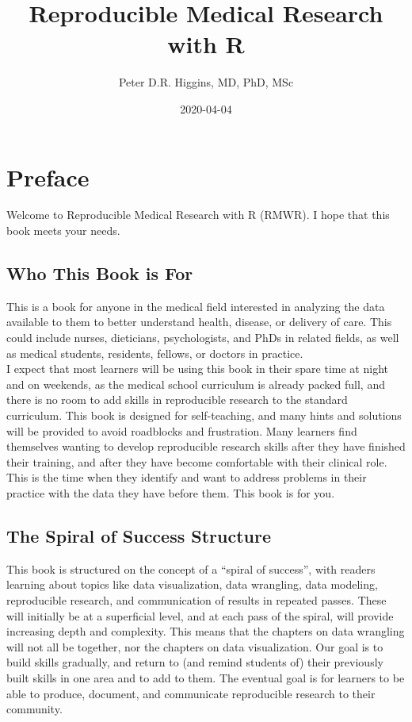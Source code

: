 \documentclass[]{book}
\title{Reproducible Medical Research with R}
\author{Peter D.R. Higgins, MD, PhD, MSc}
\date{2020-04-04}
\begin{document}
\maketitle

{
\setcounter{tocdepth}{1}
\tableofcontents
}
\hypertarget{preface}{%
\chapter{Preface}\label{preface}}

Welcome to Reproducible Medical Research with R (RMWR). I hope that this book meets your needs.

\hypertarget{who-this-book-is-for}{%
\section{Who This Book is For}\label{who-this-book-is-for}}

This is a book for anyone in the medical field interested in analyzing the data available to them to better understand health, disease, or delivery of care. This could include nurses, dieticians, psychologists, and PhDs in related fields, as well as medical students, residents, fellows, or doctors in practice.\\
I expect that most learners will be using this book in their spare time at night and on weekends, as the medical school curriculum is already packed full, and there is no room to add skills in reproducible research to the standard curriculum. This book is designed for self-teaching, and many hints and solutions will be provided to avoid roadblocks and frustration.
Many learners find themselves wanting to develop reproducible research skills after they have finished their training, and after they have become comfortable with their clinical role. This is the time when they identify and want to address problems in their practice with the data they have before them. This book is for you.

\hypertarget{the-spiral-of-success-structure}{%
\section{The Spiral of Success Structure}\label{the-spiral-of-success-structure}}

This book is structured on the concept of a ``spiral of success'', with readers learning about topics like data visualization, data wrangling, data modeling, reproducible research, and communication of results in repeated passes. These will initially be at a superficial level, and at each pass of the spiral, will provide increasing depth and complexity. This means that the chapters on data wrangling will not all be together, nor the chapters on data visualization. Our goal is to build skills gradually, and return to (and remind students of) their previously built skills in one area and to add to them. The eventual goal is for learners to be able to produce, document, and communicate reproducible research to their community.
\end{document}
